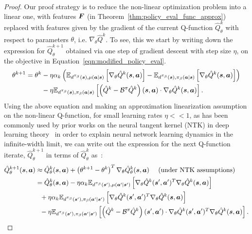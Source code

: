 \begin{proof} Our proof strategy is to reduce the non-linear optimization problem into a linear one, with features $\boldsymbol{F}$ (in Theorem~\ref{thm:policy_eval_func_approx}) replaced with features given by the gradient of the current Q-function $\hat{Q}^{k}_\theta$ with respect to parameters $\theta$, i.e. $\nabla_\theta \hat{Q}^k$. To see, this we start by writing down the expression for $\hat{Q}^{k+1}_\theta$ obtained via one step of gradient descent with step size $\eta$, on the objective in Equation~\ref{eqn:modified_policy_eval}.
\begin{align*}
    \theta^{k+1} = \theta^k &- \eta \alpha_k \left( \mathbb{E}_{d^{\pi_\beta}(\boldsymbol{s}), \mu(\boldsymbol{a}|\boldsymbol{s})}\left[\nabla_\theta \hat{Q}^{k}(\boldsymbol{s}, \boldsymbol{a})\right] - \mathbb{E}_{d^{\pi_\beta}(\boldsymbol{s}), {\pi_\beta}(\boldsymbol{a}|\boldsymbol{s})}\left[\nabla_\theta \hat{Q}^{k}(\boldsymbol{s}, \boldsymbol{a})\right] \right) \\ 
    &- \eta \mathbb{E}_{d^{\pi_\beta}(\boldsymbol{s}), {\pi_\beta}(\boldsymbol{a}|\boldsymbol{s})}\left[ \left(\hat{Q}^k - \mathcal{B}^\pi \hat{Q}^{k} \right)(\boldsymbol{s}, \boldsymbol{a}) \cdot \nabla_\theta \hat{Q}^{k}(\boldsymbol{s}, \boldsymbol{a}) \right].
\end{align*}
Using the above equation and making an approximation linearization assumption on the non-linear Q-function, for small learning rates $\eta << 1$, as has been commonly used by prior works on the neural tangent kernel (NTK) in deep learning theory~\citep{ntk} in order to explain neural network learning dynamics in the infinite-width limit, we can write out the expression for the next Q-function iterate, $\hat{Q}^{k+1}_\theta$ in terms of $\hat{Q}^k_\theta$ as~\citep{achiam2019towards,ntk}:
\begin{align*}
    \hat{Q}^{k+1}_\theta(\boldsymbol{s}, \boldsymbol{a}) &\approx \hat{Q}^k_\theta(\boldsymbol{s}, \boldsymbol{a}) + \left(\theta^{k+1} - \theta^{k}\right)^T \nabla_\theta \hat{Q}^{k}_\theta (\boldsymbol{s}, \boldsymbol{a}) ~~~~ \text{(under NTK assumptions)}\\
    &= \hat{Q}^k_\theta(\boldsymbol{s}, \boldsymbol{a}) - \eta \alpha_k \mathbb{E}_{d^{\pi_\beta}(\boldsymbol{s}'), \mu(\boldsymbol{a}'|\boldsymbol{s}')}\left[\nabla_\theta \hat{Q}^{k}(\boldsymbol{s}', \boldsymbol{a}')^T \nabla_\theta \hat{Q}^{k}(\boldsymbol{s}, \boldsymbol{a}) \right]\\
    &~~ + \eta \alpha_k \mathbb{E}_{d^{\pi_\beta}(\boldsymbol{s}'), {\pi_\beta}(\boldsymbol{a}'|\boldsymbol{s}')}\left[\nabla_\theta \hat{Q}^{k}(\boldsymbol{s}', \boldsymbol{a}')^T \nabla_\theta \hat{Q}^k(\boldsymbol{s}, \boldsymbol{a}) \right]\\
    &~~ - \eta \mathbb{E}_{d^{\pi_\beta}(\boldsymbol{s}'), {\pi_\beta}(\boldsymbol{a}'|\boldsymbol{s}')}\left[ \left(\hat{Q}^k - \mathcal{B}^\pi \hat{Q}^{k} \right)(\boldsymbol{s}', \boldsymbol{a}') \cdot \nabla_\theta \hat{Q}^{k}(\boldsymbol{s}', \boldsymbol{a}')^T \nabla_\theta \hat{Q}^k(\boldsymbol{s}, \boldsymbol{a}) \right].
\end{align*}

\end{proof}
